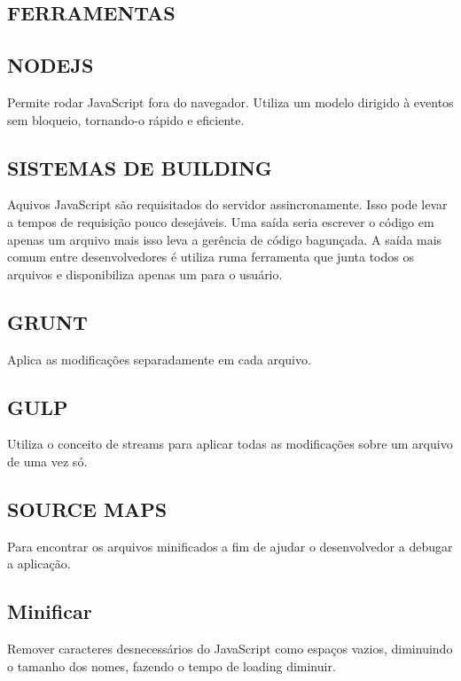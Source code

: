 \documentclass[11pt,a4paper]{article}
\begin{document}
\subsection{FERRAMENTAS}

\subsection{NODEJS}

Permite rodar JavaScript fora do navegador. Utiliza um modelo dirigido
à eventos sem bloqueio, tornando-o rápido e eficiente.

\subsection{SISTEMAS DE BUILDING}

Aquivos JavaScript são requisitados do servidor assincronamente. Isso
pode levar a tempos de requisição pouco desejáveis. Uma saída seria
escrever o código em apenas um arquivo mais isso leva a gerência de
código bagunçada. A saída mais comum entre desenvolvedores é utiliza
ruma ferramenta que junta todos os arquivos e disponibiliza apenas um
para o usuário.

\subsection{GRUNT}

Aplica as modificações separadamente em cada arquivo.

\subsection{GULP}

Utiliza o conceito de streams para aplicar todas as modificações sobre
um arquivo de uma vez só.

\subsection{SOURCE MAPS}

Para encontrar os arquivos minificados a fim de ajudar o desenvolvedor a
debugar a aplicação.

\subsection{Minificar}

Remover caracteres desnecessários do JavaScript como espaços vazios,
diminuindo o tamanho dos nomes, fazendo o tempo de loading diminuir.
\end{document}
